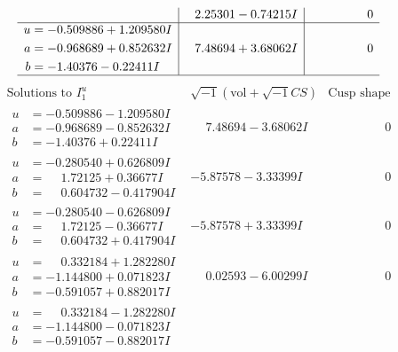 \documentclass[1p]{elsarticle_modified}
\theoremstyle{definition}
\newcommand{\I}{\sqrt{-1}}
\begin{document}
$$\begin{array}{c|c|c}
 & \phantom{-}2.25301 - 0.74215 I & \phantom{-0.000000 } 0 \\ \hline\begin{aligned}
u &= -0.509886 + 1.209580 I \\
a &= -0.968689 + 0.852632 I \\
b &= -1.40376 - 0.22411 I\end{aligned}
 & \phantom{-}7.48694 + 3.68062 I & \phantom{-0.000000 } 0\\
 \hline 
 \end{array}$$\newpage$$\begin{array}{c|c|c}  
\text{Solutions to }I^u_{1}& \I (\text{vol} + \sqrt{-1}CS) & \text{Cusp shape}\\
 \hline 
\begin{aligned}
u &= -0.509886 - 1.209580 I \\
a &= -0.968689 - 0.852632 I \\
b &= -1.40376 + 0.22411 I\end{aligned}
 & \phantom{-}7.48694 - 3.68062 I & \phantom{-0.000000 } 0 \\ \hline\begin{aligned}
u &= -0.280540 + 0.626809 I \\
a &= \phantom{-}1.72125 + 0.36677 I \\
b &= \phantom{-}0.604732 - 0.417904 I\end{aligned}
 & -5.87578 - 3.33399 I & \phantom{-0.000000 } 0 \\ \hline\begin{aligned}
u &= -0.280540 - 0.626809 I \\
a &= \phantom{-}1.72125 - 0.36677 I \\
b &= \phantom{-}0.604732 + 0.417904 I\end{aligned}
 & -5.87578 + 3.33399 I & \phantom{-0.000000 } 0 \\ \hline\begin{aligned}
u &= \phantom{-}0.332184 + 1.282280 I \\
a &= -1.144800 + 0.071823 I \\
b &= -0.591057 + 0.882017 I\end{aligned}
 & \phantom{-}0.02593 - 6.00299 I & \phantom{-0.000000 } 0 \\ \hline\begin{aligned}
u &= \phantom{-}0.332184 - 1.282280 I \\
a &= -1.144800 - 0.071823 I \\
b &= -0.591057 - 0.882017 I\end{aligned}

\end{array}$$
\end{document}
